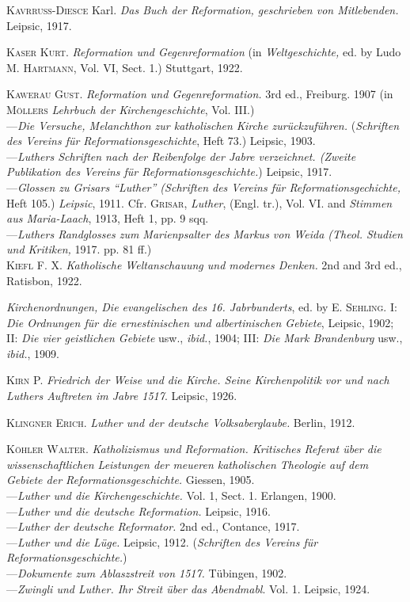 \textsc{Kavrruss-Diesce} Karl. \textit{Das Buch der Reformation, geschrieben von Mitlebenden.}
Leipsic, 1917.

\textsc{Kaser Kurt.} \textit{Reformation und Gegenreformation} (in \textit{Weltgeschichte,} ed.
by Ludo \textsc{M. Hartmann}, Vol. VI, Sect. 1.) Stuttgart, 1922.

\textsc{Kawerau Gust.} \textit{Reformation und Gegenreformation.} 3rd ed., Freiburg. 1907
(in \textsc{Möllers} \textit{Lehrbuch der Kirchengeschichte}, Vol. III.) \\
---\textit{Die Versuche, Melanchthon zur katholischen Kirche zurückzuführen.}
(\textit{Schriften des Vereins für Reformationsgeschichte}, Heft 73.) Leipsic,
1903. \\
---\textit{Luthers Schriften nach der Reibenfolge der Jabre verzeichnet. (Zweite
Publikation des Vereins für Reformationsgeschichte.}) Leipsic, 1917. \\
---\textit{Glossen zu Grisars “Luther” (Schriften des Vereins für Reformationsgechichte,}
Heft 105.) \textit{Leipsic}, 1911. Cfr. \textsc{Grisar}, \textit{Luther}, (Engl. tr.), Vol.
VI. and \textit{Stimmen aus Maria-Laach}, 1913, Heft 1, pp. 9 sqq. \\
---\textit{Luthers Randglosses zum Marienpsalter des Markus von Weida (Theol.
Studien und Kritiken,} 1917. pp. 81 ff.) \\

\textsc{Kiefl F. X.} \textit{Katholische Weltanschauung und modernes Denken.} 2nd and
3rd ed., Ratisbon, 1922.

\textit{Kirchenordnungen, Die evangelischen des 16. Jabrbunderts}, ed. by \textsc{E. Sehling.}
I: \textit{Die Ordnungen für die ernestinischen und albertinischen Gebiete}, Leipsic, 1902;
II: \textit{Die vier geistlichen Gebiete} usw., \textit{ibid.}, 1904;
III: \textit{Die Mark Brandenburg} usw., \textit{ibid.}, 1909.

\textsc{Kirn P.} \textit{Friedrich der Weise und die Kirche. Seine Kirchenpolitik vor und
nach Luthers Auftreten im Jabre 1517}. Leipsic, 1926.

\textsc{Klingner Erich.} \textit{Luther und der deutsche Volksaberglaube.} Berlin, 1912.

\textsc{Köhler Walter}. \textit{Katholizismus und Reformation. Kritisches Referat über
die wissenschaftlichen Leistungen der meueren katholischen Theologie auf
dem Gebiete der Reformationsgeschichte.} Giessen, 1905. \\
---\textit{Luther und die Kirchengeschichte.} Vol. 1, Sect. 1. Erlangen, 1900. \\
---\textit{Luther und die deutsche Reformation.} Leipsic, 1916. \\
---\textit{Luther der deutsche Reformator.} 2nd ed., Contance, 1917. \\
---\textit{Luther und die Lüge.} Leipsic, 1912. (\textit{Schriften des Vereins für Reformationsgeschichte.}) \\
---\textit{Dokumente zum Ablaszstreit von 1517.} Tübingen, 1902. \\
---\textit{Zwingli und Luther. Ihr Streit über das Abendmabl}. Vol. 1. Leipsic,
1924. \\

